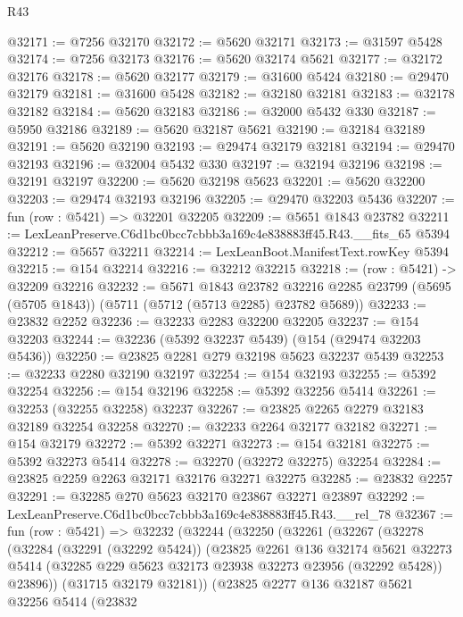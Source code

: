 \begin{lexlean}{R43}
\begin{coremodule}
@32171 := @7256 @32170
@32172 := @5620 @32171
@32173 := @31597 @5428
@32174 := @7256 @32173
@32176 := @5620 @32174 @5621
@32177 := @32172 @32176
@32178 := @5620 @32177
@32179 := @31600 @5424
@32180 := @29470 @32179
@32181 := @31600 @5428
@32182 := @32180 @32181
@32183 := @32178 @32182
@32184 := @5620 @32183
@32186 := @32000 @5432 @330
@32187 := @5950 @32186
@32189 := @5620 @32187 @5621
@32190 := @32184 @32189
@32191 := @5620 @32190
@32193 := @29474 @32179 @32181
@32194 := @29470 @32193
@32196 := @32004 @5432 @330
@32197 := @32194 @32196
@32198 := @32191 @32197
@32200 := @5620 @32198 @5623
@32201 := @5620 @32200
@32203 := @29474 @32193 @32196
@32205 := @29470 @32203 @5436
@32207 := fun (row : @5421) => @32201 @32205
@32209 := @5651 @1843 @23782
@32211 := LexLeanPreserve.C6d1bc0bcc7cbbb3a169c4e838883ff45.R43.__fits_65 @5394
@32212 := @5657 @32211
@32214 := LexLeanBoot.ManifestText.rowKey @5394
@32215 := @154 @32214
@32216 := @32212 @32215
@32218 := (row : @5421) -> @32209 @32216
@32232 := @5671
    @1843
    @23782
    @32216
    @2285
    @23799
    (@5695 (@5705 @1843))
    (@5711 (@5712 (@5713 @2285) @23782 @5689))
@32233 := @23832 @2252
@32236 := @32233 @2283 @32200 @32205
@32237 := @154 @32203
@32244 := @32236 (@5392 @32237 @5439) (@154 (@29474 @32203 @5436))
@32250 := @23825 @2281 @279 @32198 @5623 @32237 @5439
@32253 := @32233 @2280 @32190 @32197
@32254 := @154 @32193
@32255 := @5392 @32254
@32256 := @154 @32196
@32258 := @5392 @32256 @5414
@32261 := @32253 (@32255 @32258) @32237
@32267 := @23825 @2265 @2279 @32183 @32189 @32254 @32258
@32270 := @32233 @2264 @32177 @32182
@32271 := @154 @32179
@32272 := @5392 @32271
@32273 := @154 @32181
@32275 := @5392 @32273 @5414
@32278 := @32270 (@32272 @32275) @32254
@32284 := @23825 @2259 @2263 @32171 @32176 @32271 @32275
@32285 := @23832 @2257
@32291 := @32285 @270 @5623 @32170 @23867 @32271 @23897
@32292 := LexLeanPreserve.C6d1bc0bcc7cbbb3a169c4e838883ff45.R43.__rel_78
@32367 := fun (row : @5421) =>
  @32232
    (@32244
      (@32250
        (@32261
          (@32267
            (@32278
              (@32284
                (@32291 (@32292 @5424))
                (@23825
                  @2261
                  @136
                  @32174
                  @5621
                  @32273
                  @5414
                  (@32285 @229 @5623 @32173 @23938 @32273 @23956 (@32292 @5428))
                  @23896))
              (@31715 @32179 @32181))
            (@23825
              @2277
              @136
              @32187
              @5621
              @32256
              @5414
              (@23832

\end{coremodule}
\end{lexlean}
